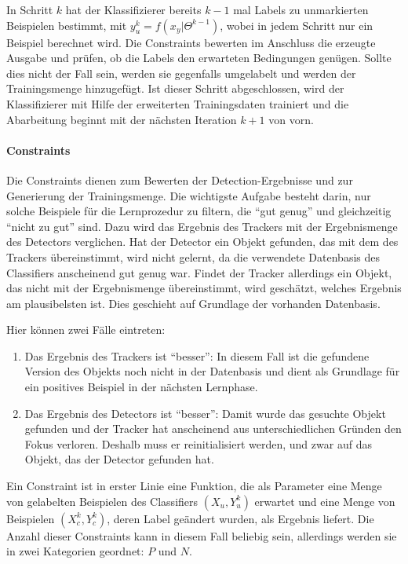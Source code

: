 	In Schritt $k$ hat der Klassifizierer bereits $k-1$ mal Labels zu unmarkierten Beispielen bestimmt, mit $y_{u}^{k}=f(x_{y}|\Theta^{k-1})$, wobei in jedem Schritt nur ein Beispiel berechnet wird. Die Constraints bewerten im Anschluss die erzeugte Ausgabe und prüfen, ob die Labels den erwarteten Bedingungen genügen. Sollte dies nicht der Fall sein, werden sie gegenfalls umgelabelt und werden der Trainingsmenge hinzugefügt. Ist dieser Schritt abgeschlossen, wird der Klassifizierer mit Hilfe der erweiterten Trainingsdaten trainiert und die Abarbeitung beginnt mit der nächsten Iteration $k+1$ von vorn.

	\paragraph{Constraints}
	Die Constraints dienen zum Bewerten der Detection-Ergebnisse und zur Generierung der Trainingsmenge. Die wichtigste Aufgabe besteht darin, nur solche Beispiele für die Lernprozedur zu filtern, die ``gut genug'' und gleichzeitig ``nicht zu gut'' sind. Dazu wird das Ergebnis des Trackers mit der Ergebnismenge des Detectors verglichen. Hat der Detector ein Objekt gefunden, das mit dem des Trackers übereinstimmt, wird nicht gelernt, da die verwendete Datenbasis des Classifiers anscheinend gut genug war. Findet der Tracker allerdings ein Objekt, das nicht mit der Ergebnismenge übereinstimmt, wird geschätzt, welches Ergebnis am plausibelsten ist. Dies geschieht auf Grundlage der vorhanden Datenbasis.

	Hier können zwei Fälle eintreten:
	\begin{enumerate}
	\item Das Ergebnis des Trackers ist ``besser'': In diesem Fall ist die gefundene Version des Objekts noch nicht in der Datenbasis und dient als Grundlage für ein positives Beispiel in der nächsten Lernphase.
	\item Das Ergebnis des Detectors ist ``besser'': Damit wurde das gesuchte Objekt gefunden und der Tracker hat anscheinend aus unterschiedlichen Gründen den Fokus verloren. Deshalb muss er reinitialisiert werden, und zwar auf das Objekt, das der Detector gefunden hat.
	\end{enumerate} 

	Ein Constraint ist in erster Linie eine Funktion, die als Parameter eine Menge von gelabelten Beispielen des Classifiers $(X_{u},Y_{u}^{k})$ erwartet und eine Menge von Beispielen $(X_{c}^{k},Y_{c}^{k})$, deren Label geändert wurden, als Ergebnis liefert. Die Anzahl dieser Constraints kann in diesem Fall beliebig sein, allerdings werden sie in zwei Kategorien geordnet: $P$ und $N$. 

